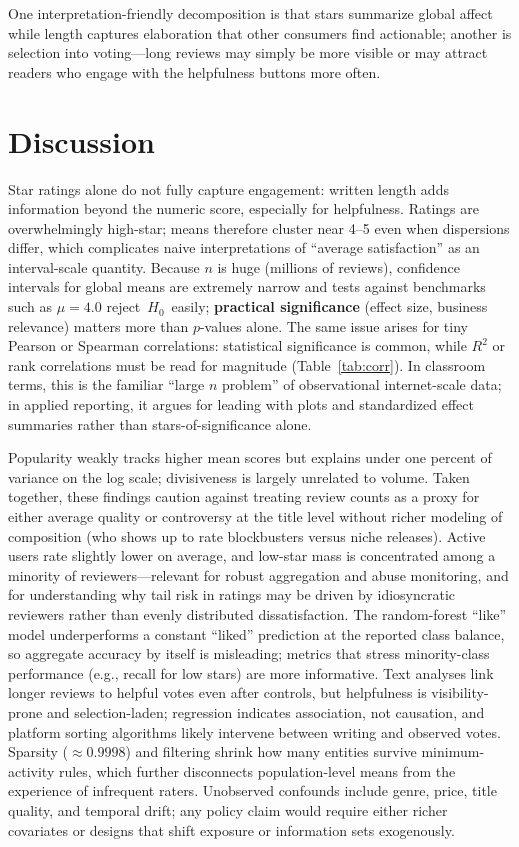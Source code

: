 \documentclass[conference]{IEEEtran}
\begin{document}
One interpretation-friendly decomposition is that stars summarize global affect while length captures elaboration that other consumers find actionable; another is selection into voting---long reviews may simply be more visible or may attract readers who engage with the helpfulness buttons more often.

\section{Discussion}
Star ratings alone do not fully capture engagement: written length adds information beyond the numeric score, especially for helpfulness. Ratings are overwhelmingly high-star; means therefore cluster near 4--5 even when dispersions differ, which complicates naive interpretations of ``average satisfaction'' as an interval-scale quantity. Because $n$ is huge (millions of reviews), confidence intervals for global means are extremely narrow and tests against benchmarks such as $\mu=4.0$ \mbox{reject $H_0$ easily}; \textbf{practical significance} (effect size, business relevance) matters more than $p$-values alone. The same issue arises for tiny Pearson or Spearman correlations: statistical significance is common, while $R^2$ or rank correlations must be read for magnitude (Table~\ref{tab:corr}). In classroom terms, this is the familiar ``large $n$ problem'' of observational internet-scale data; in applied reporting, it argues for leading with plots and standardized effect summaries rather than stars-of-significance alone.

Popularity weakly tracks higher mean scores but explains under one percent of variance on the log scale; divisiveness is largely unrelated to volume. Taken together, these findings caution against treating review counts as a proxy for either average quality or controversy at the title level without richer modeling of composition (who shows up to rate blockbusters versus niche releases). Active users rate slightly lower on average, and low-star mass is concentrated among a minority of reviewers---relevant for robust aggregation and abuse monitoring, and for understanding why tail risk in ratings may be driven by idiosyncratic reviewers rather than evenly distributed dissatisfaction. The random-forest ``like'' model underperforms a constant ``liked'' prediction at the reported class balance, so aggregate accuracy by itself is misleading; metrics that stress minority-class performance (e.g., recall for low stars) are more informative. Text analyses link longer reviews to helpful votes even after controls, but helpfulness is visibility-prone and selection-laden; regression indicates association, not causation, and platform sorting algorithms likely intervene between writing and observed votes. Sparsity ($\approx 0.9998$) and filtering shrink how many entities survive minimum-activity rules, which further disconnects population-level means from the experience of infrequent raters. Unobserved confounds include genre, price, title quality, and temporal drift; any policy claim would require either richer covariates or designs that shift exposure or information sets exogenously.
\end{document}
